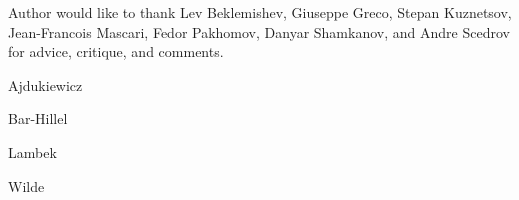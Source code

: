 \documentclass[a4paper]{article}
\theoremstyle{defin}
\theoremstyle{theorem}
\theoremstyle{prop}
\theoremstyle{lemma}
\theoremstyle{ex}
\theoremstyle{col}
\begin{document}
Author would like to thank Lev Beklemishev, Giuseppe Greco, Stepan Kuznetsov, Jean-Francois Mascari, Fedor Pakhomov, Danyar Shamkanov, and Andre Scedrov for advice, critique, and comments.


\begin{thebibliography}{}

   Ajdukiewicz

   Bar-Hillel

   Lambek

   Wilde
\end{thebibliography}
\end{document}
